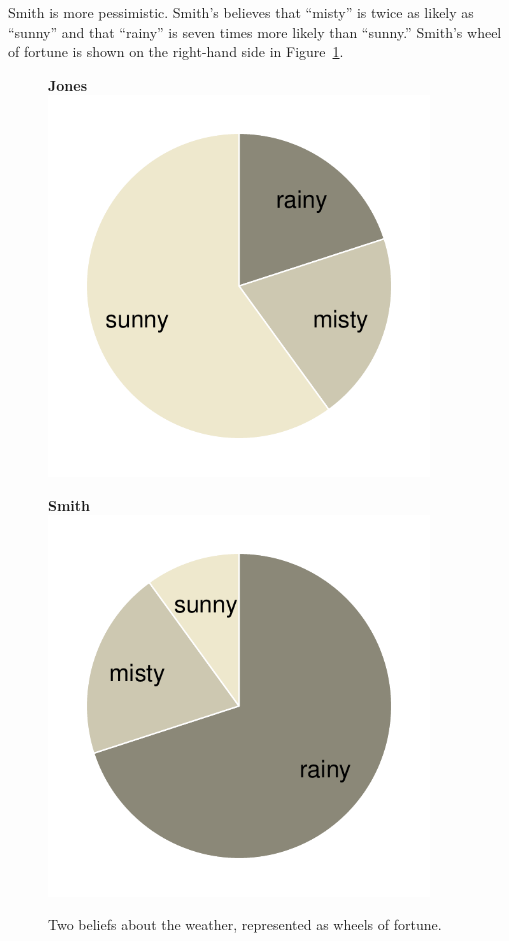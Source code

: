 \documentclass[nobib,nofonts]{tufte-handout}
\begin{document}
Smith is more pessimistic.
Smith's believes that ``misty'' is twice as likely as ``sunny'' and that ``rainy'' is seven times more likely than ``sunny.''
Smith's wheel of fortune is shown on the right-hand side in Figure~\ref{fig:belief-wheels}.

\begin{figure}
  \centering
  \begin{minipage}{0.45\linewidth}
    \centering
    \textbf{Jones}
    \includegraphics[width=0.9\textwidth]{00-pics/pie-chart-beliefs-Jones.pdf}
  \end{minipage}
  \hfill
  \begin{minipage}{0.45\linewidth}
    \centering
    \textbf{Smith}
    \includegraphics[width=0.9\textwidth]{00-pics/pie-chart-beliefs-Smith.pdf}
  \end{minipage}
  \caption{Two beliefs about the weather, represented as wheels of fortune.}
  \label{fig:belief-wheels}
\end{figure}
\end{document}
